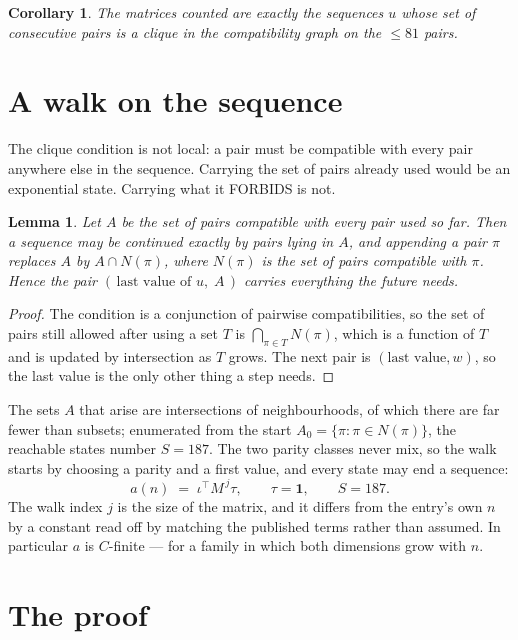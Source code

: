\documentclass[11pt,a4paper]{article}
\theoremstyle{plain}
\newtheorem{lemma}[theorem]{Lemma}
\newtheorem{corollary}[theorem]{Corollary}
\theoremstyle{definition}
\begin{document}
\begin{corollary}
The matrices counted are exactly the sequences $u$ whose set of consecutive pairs is a clique in
the compatibility graph on the $\le 81$ pairs.
\end{corollary}

\section{A walk on the sequence}

The clique condition is not local: a pair must be compatible with every pair anywhere else in
the sequence. Carrying the set of pairs already used would be an exponential state. Carrying
what it FORBIDS is not.

\begin{lemma}\label{lem:lump}
Let $A$ be the set of pairs compatible with every pair used so far. Then a sequence may be
continued exactly by pairs lying in $A$, and appending a pair $\pi$ replaces $A$ by
$A\cap N(\pi)$, where $N(\pi)$ is the set of pairs compatible with $\pi$. Hence the pair
$(\,\text{last value of }u,\;A\,)$ carries everything the future needs.
\end{lemma}

\begin{proof}
The condition is a conjunction of pairwise compatibilities, so the set of pairs still allowed
after using a set $T$ is $\bigcap_{\pi\in T}N(\pi)$, which is a function of $T$ and is updated
by intersection as $T$ grows. The next pair is $(\text{last value},w)$, so the last value is
the only other thing a step needs.
\end{proof}

The sets $A$ that arise are intersections of neighbourhoods, of which there are far fewer than
subsets; enumerated from the start $A_0=\{\pi:\pi\in N(\pi)\}$, the reachable states number
$S=187$. The two parity classes never mix, so the walk starts by choosing a parity and a first
value, and every state may end a sequence:
\[
a(n)\;=\;\iota^{\!\top}M^{\,j}\tau ,\qquad \tau=\mathbf{1},\qquad S=187.
\]
The walk index $j$ is the size of the matrix, and it differs from the entry's own $n$ by a
constant read off by matching the published terms rather than assumed. In particular $a$ is
$C$-finite --- for a family in which both dimensions grow with $n$.

\section{The proof}
\end{document}
